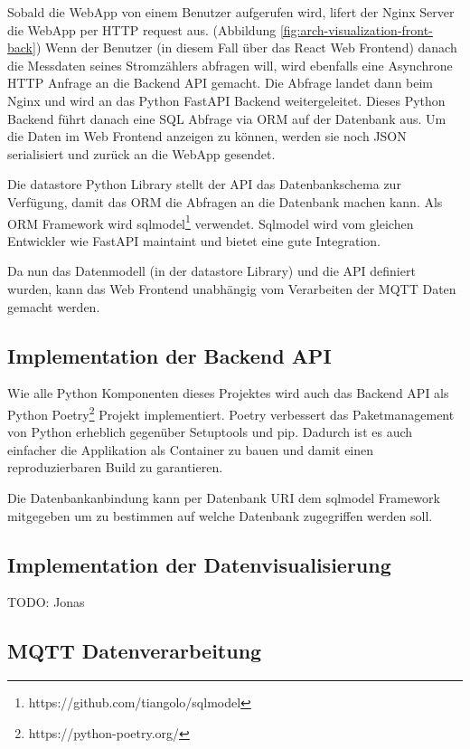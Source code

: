 Sobald die WebApp von einem Benutzer aufgerufen wird, lifert der Nginx Server
die WebApp per \ac{HTTP} request aus. (Abbildung \ref{fig:arch-visualization-front-back})
Wenn der Benutzer (in diesem Fall über das React Web Frontend) danach die Messdaten seines
Stromzählers abfragen will, wird ebenfalls eine Asynchrone \ac{HTTP} Anfrage an die Backend \ac{API} gemacht.
Die Abfrage landet dann beim Nginx und wird an das Python FastAPI Backend weitergeleitet.
Dieses Python Backend führt danach eine SQL Abfrage via \ac{ORM} auf der Datenbank aus.
Um die Daten im Web Frontend anzeigen zu können, werden sie noch \ac{JSON} serialisiert
und zurück an die WebApp gesendet.

Die datastore Python Library stellt der \ac{API} das Datenbankschema zur Verfügung,
damit das \ac{ORM} die Abfragen an die Datenbank machen kann.
Als \ac{ORM} Framework wird sqlmodel\footnote{https://github.com/tiangolo/sqlmodel} verwendet.
Sqlmodel wird vom gleichen Entwickler wie FastAPI maintaint und bietet eine gute Integration.

Da nun das Datenmodell (in der datastore Library) und die \ac{API} definiert wurden,
kann das Web Frontend unabhängig vom Verarbeiten der \ac{MQTT} Daten gemacht werden.

\subsection{Implementation der Backend \ac{API}}

Wie alle Python Komponenten dieses Projektes wird auch das Backend \ac{API}
als Python Poetry\footnote{https://python-poetry.org/} Projekt implementiert.
Poetry verbessert das Paketmanagement von Python erheblich gegenüber Setuptools
und pip. \cite{python_poetry}
Dadurch ist es auch einfacher die Applikation als Container zu bauen und
damit einen reproduzierbaren Build zu garantieren.

Die Datenbankanbindung kann per Datenbank \ac{URI} dem sqlmodel Framework
mitgegeben um zu bestimmen auf welche Datenbank zugegriffen werden soll.

\subsection{Implementation der Datenvisualisierung}

TODO: Jonas

\subsection{\ac{MQTT} Datenverarbeitung}

